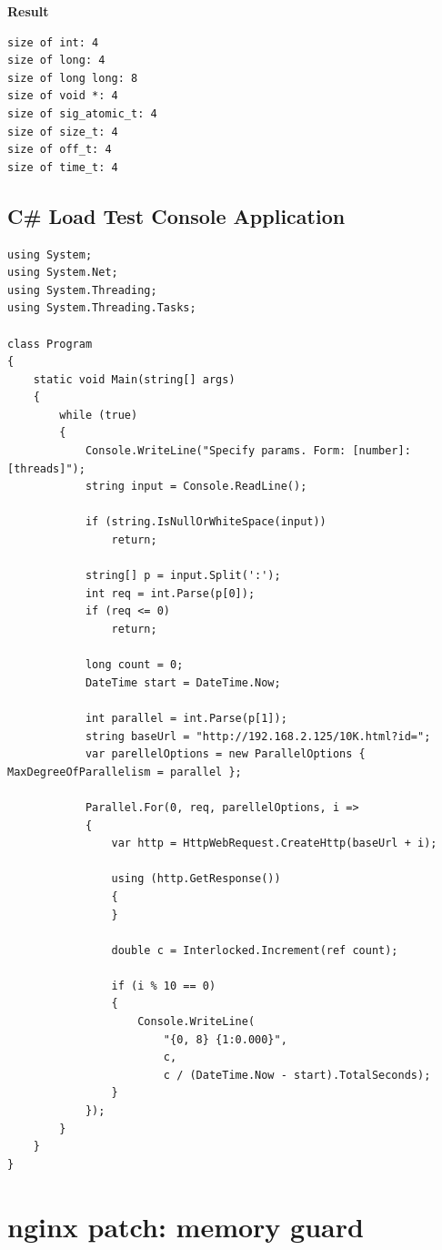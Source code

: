 \textbf{Result}
\begin{verbatim}
size of int: 4
size of long: 4
size of long long: 8
size of void *: 4
size of sig_atomic_t: 4
size of size_t: 4
size of off_t: 4
size of time_t: 4
\end{verbatim}

\subsection{C\# Load Test Console Application}
\label{appendix:csharp-load}

\begin{verbatim}
using System;
using System.Net;
using System.Threading;
using System.Threading.Tasks;

class Program
{
    static void Main(string[] args)
    {
        while (true)
        {
            Console.WriteLine("Specify params. Form: [number]:[threads]");
            string input = Console.ReadLine();

            if (string.IsNullOrWhiteSpace(input))
                return;

            string[] p = input.Split(':');
            int req = int.Parse(p[0]);
            if (req <= 0)
                return;

            long count = 0;
            DateTime start = DateTime.Now;

            int parallel = int.Parse(p[1]);
            string baseUrl = "http://192.168.2.125/10K.html?id=";
            var parellelOptions = new ParallelOptions { MaxDegreeOfParallelism = parallel };

            Parallel.For(0, req, parellelOptions, i =>
            {
                var http = HttpWebRequest.CreateHttp(baseUrl + i);
                    
                using (http.GetResponse())
                {
                }

                double c = Interlocked.Increment(ref count);

                if (i % 10 == 0)
                {
                    Console.WriteLine(
                        "{0, 8} {1:0.000}", 
                        c, 
                        c / (DateTime.Now - start).TotalSeconds);
                }
            });
        }
    }
}
\end{verbatim}

\section{nginx patch: memory guard}
\label{appendix:memguard}

\begin{verbatim}

\end{verbatim}
